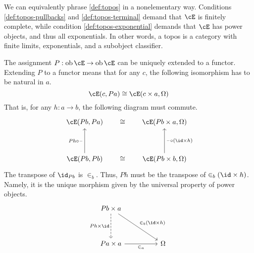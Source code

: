 \documentclass[article,10pt,oneside]{memoir}
\begin{document}
\begin{rmk}
  We can equivalently phrase \cref{def:topos} in a nonelementary way.
  Conditions \ref{def:topos-pullbacks} and \ref{def:topos-terminal} demand that $\cE$ is finitely complete, while condition \ref{def:topos-exponential} demands that $\cE$ has power objects, and thus all exponentials.
  In other words, a topos is a category with finite limits, exponentials, and a subobject classifier.
\end{rmk}

\begin{rmk}
  The assignment $P : \ob\cE \to \ob\cE$ can be uniquely extended to a functor.
  Extending $P$ to a functor means that for any $c$, the following isomorphism has to be natural in $a$.
  \[
    \cE(c, Pa) \iso \cE(c \times a, \Omega)
  \]
  That is, for any $h : a \to b$, the following diagram must commute.
  \[\begin{tikzcd}
      {\cE(Pb,Pa)} && {\cE(Pb \times a, \Omega)} \\
      \\
      {\cE(Pb, Pb)} && {\cE(Pb \times b, \Omega)}
      \arrow["\iso"{marking, allow upside down}, draw=none, from=1-1, to=1-3]
      \arrow["\iso"{marking, allow upside down}, draw=none, from=3-1, to=3-3]
      \arrow["{\blank \circ (\id \times h)}"', from=3-3, to=1-3]
      \arrow["{Ph \circ \blank}", from=3-1, to=1-1]
    \end{tikzcd}\]
  The transpose of $\id_{Pb}$ is $\in_{b}$.
  Thus, $Ph$ must be the transpose of $\in_{b}(\id \times h)$.
  Namely, it is the unique morphism given by the universal property of power objects.
  \[\begin{tikzcd}
      {Pb \times a} \\
      \\
      {Pa \times a} && \Omega
      \arrow["{\in_{a}}"', from=3-1, to=3-3]
      \arrow["{\in_{b}(\id \times h)}", from=1-1, to=3-3]
      \arrow["{Ph \times \id}"', dashed, from=1-1, to=3-1]
    \end{tikzcd}\]
\end{rmk}
\end{document}

